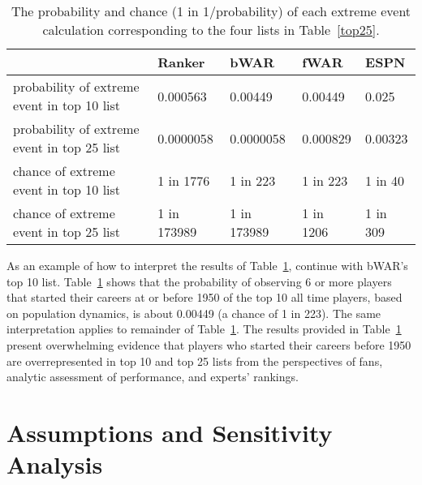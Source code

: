 \documentclass[11pt]{article}\usepackage[]{graphicx}\usepackage[]{color}
\begin{document}
\begin{table}[h!]
\begin{center}
\begin{tabular}{lllll}
\hline
  &  Ranker  &  bWAR  &  fWAR  &  ESPN \\
  \hline
probability of extreme event in top 10 list 
  & 0.000563 
  & 0.00449 
  & 0.00449 
  & 0.025 \\
probability of extreme event in top 25 list 
  & 0.0000058 
  & 0.0000058 
  & 0.000829 
  & 0.00323 \\
chance of extreme event in top 10 list 
  & 1 in 1776 
  & 1 in 223 
  & 1 in 223 
  & 1 in 40 \\
chance of extreme event in top 25 list 
  & 1 in 173989 
  & 1 in 173989 
  & 1 in 1206 
  & 1 in 309 \\
  \hline
\end{tabular}
\end{center}
\caption{The probability and chance (1 in 1/probability) of each extreme event 
  calculation corresponding to the four lists in Table~\ref{top25}.}
\label{probvalues}
\end{table}

As an example of how to interpret the results of Table~\ref{probvalues}, 
continue with bWAR's top 10 list.  Table~\ref{probvalues} shows that the 
probability of observing 6 or more players that started their careers at 
or before 1950 of the top 10 all time players, based on population 
dynamics, is about 0.00449 
(a chance of 1 in 223).
The same interpretation applies to remainder of Table~\ref{probvalues}.  
The results provided in Table~\ref{probvalues} present overwhelming evidence 
that players who started their careers before 1950 are overrepresented in top 
10 and top 25 lists from the perspectives of fans, analytic assessment of 
performance, and experts' rankings.  %




\section{Assumptions and Sensitivity Analysis}
\label{sec:Assumptions}
\end{document}
